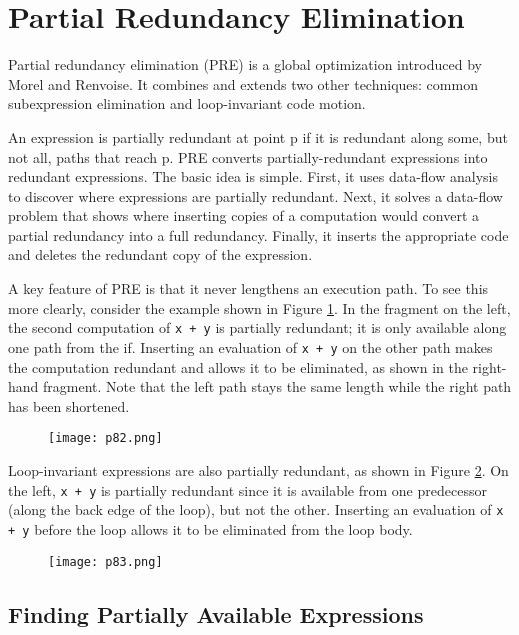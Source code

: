 \newpage

\section{Partial Redundancy Elimination}
Partial redundancy elimination (PRE) is a global optimization introduced by Morel and Renvoise\cite{morel1979global}. It
combines and extends two other techniques: common subexpression elimination and loop-invariant code motion. 

An expression is partially redundant at point p if it
is redundant along some, but not all, paths that reach
p. PRE converts partially-redundant expressions into
redundant expressions. The basic idea is simple. First,
it uses data-flow analysis to discover where expressions
are partially redundant. Next, it solves a data-flow
problem that shows where inserting copies of a computation would convert a partial redundancy into a full
redundancy. Finally, it inserts the appropriate code and
deletes the redundant copy of the expression.

A key feature of PRE is that it never lengthens an
execution path. To see this more clearly, consider the
example shown in Figure \ref{fig:p82}. In the fragment on the left, the second
computation of \texttt{x + y} is partially redundant; it is only
available along one path from the if. Inserting an evaluation of 
\texttt{x + y} on the other path makes the computation
redundant and allows it to be eliminated, as shown in
the right-hand fragment. Note that the left path stays
the same length while the right path has been shortened.


\begin{figure}[H]
    \centering
     \texttt{[image: p82.png]}
         \caption{}
         \label{fig:p82}
\end{figure}


Loop-invariant expressions are also partially redundant,
as shown in Figure \ref{fig:p83}. On the left, \texttt{x + y} is
partially redundant since it is available from one predecessor 
(along the back edge of the loop), but not the
other. Inserting an evaluation of \texttt{x + y} before the loop
allows it to be eliminated from the loop body.


\begin{figure}[H]
    \centering
     \texttt{[image: p83.png]}
         \caption{}
         \label{fig:p83}
\end{figure}


\subsection{Finding Partially Available Expressions}

